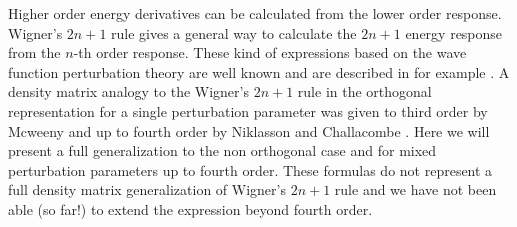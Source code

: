 \documentclass[prl,aps,letterpaper,twocolumn,showpacs,twocolumngrid,superbib]{revtex4}
\begin{document}
Higher order energy derivatives can be calculated from the lower
order response. Wigner's $2n+1$ rule gives a general way to calculate the $2n+1$
energy response from the $n$-th order response. These kind of expressions
based on the wave function perturbation theory are well known and are 
described in for example \cite{Dupuis_1991}.
A density matrix analogy to the Wigner's $2n+1$ rule in the orthogonal 
representation for a single perturbation parameter
was given to third order by Mcweeny \cite{RMcWeeny62}
and up to fourth order by Niklasson and Challacombe \cite{ANiklasson04}.
Here we will present a full generalization to the non orthogonal case 
and for mixed perturbation parameters up to fourth order. These formulas
do not represent a full density matrix generalization of Wigner's $2n+1$ 
rule and we have not been able (so far!) to extend the expression beyond 
fourth order. 

%
%
\end{document}
